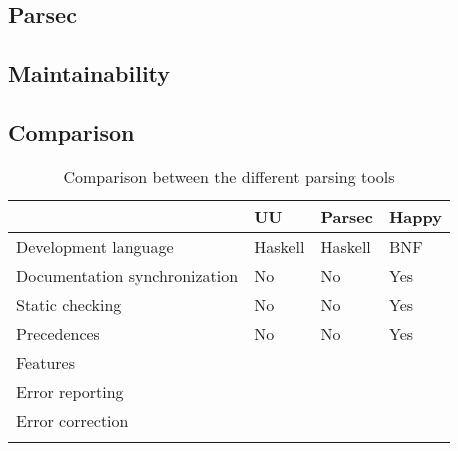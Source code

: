 \subsection{Parsec}
%




\subsection{Maintainability}

\subsection{Comparison}
\begin{longtable}{|l|l|l|l|}\hline
	\textbf{} & \textbf{UU} & \textbf{Parsec} & \textbf{Happy} \\\hline
	\endhead
	
	Development language 	  & Haskell & Haskell & BNF \\\hline
	Documentation synchronization  & No & No & Yes \\\hline
	Static checking			  & No & No & Yes \\\hline
	Precedences & No & No & Yes \\\hline
	Features & & & \\\hline
	Error reporting & & & \\\hline
	Error correction & & & \\\hline
	
	\caption{Comparison between the different parsing tools}
	\label{tab:comparison}
\end{longtable}

